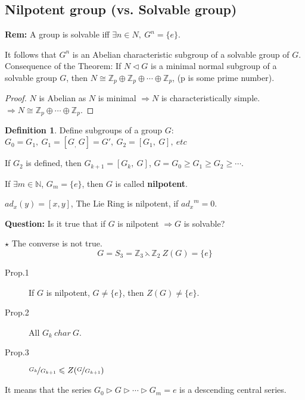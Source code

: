\documentclass[12pt, a4paper]{article}
\theoremstyle{definition}
\newtheorem{definition}{Definition}[section]
\begin{document}
\subsection{Nilpotent group (vs. Solvable group)}
\textbf{Rem:} A group is solvable iff $\exists n\in N,\ G^{n}=\{e\} $.
\par
It follows that $G^{n}$ is an Abelian characteristic subgroup of a solvable group of $G$. 
Consequence of the Theorem: If $N\lhd G$ is a minimal normal subgroup of a solvable group 
$G$, then $N\cong {\mathbb{Z}}_p \oplus {\mathbb{Z}}_p \oplus\cdots\oplus {\mathbb{Z}}_p $, (p 
is some prime number).
\begin{proof}
    $N$ is Abelian as $N$ is minimal $\Rightarrow N $ is characteristically simple. 
    $\Rightarrow N\cong {\mathbb{Z}}_p \oplus\cdots\oplus {\mathbb{Z}}_p $.
    \par
\end{proof}
\par
\begin{definition}
    Define subgroups of a group $G$: $G_0 = G_1,\ G_1 = [G_,\ G]=G',\ G_2 =[G_1,\ G],\ etc$
    \par
    If $G_2$ is defined, then $G_{k+1}=[G_k,\ G]$, $G = G_0 \geqslant G_1\geqslant G_2
    \geqslant \cdots $.
    \par
    If $\exists m\in \mathbb{N}$, $ G_m =\{e\} $, then $G$ is called \textbf{nilpotent}.
\end{definition}
$ad_x(y)=[x,y]$, The Lie Ring is nilpotent, if ${ad_x}^m= 0$.\par
\textbf{Question: }Is it true that if $G$ is nilpotent $\Rightarrow G$ is solvable?
\par
$\star$ The converse is not true.
\[G = S_3={\mathbb{Z}}_3\leftthreetimes{\mathbb{Z}}_2\ Z(G) = \{e\} \]
\begin{description}
    \item[Prop.1] If $G$ is nilpotent, $G \neq \{e\}$, then $Z(G) \neq \{e\}$.
    \item[Prop.2] All $G_k\ char\ G$.
    \item[Prop.3] $\nicefrac{G_k}{G_{k+1}}\leqslant Z(\nicefrac{G}{G_{k+1}})$ 
\end{description}
\par
It means that the series $G_0\rhd G\rhd \cdots \rhd G_m = {e}$ is a descending central 
series.
\end{document}
